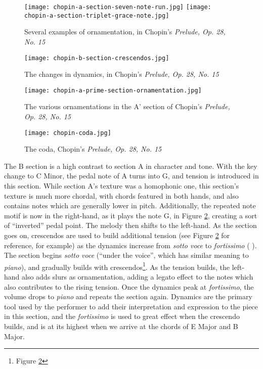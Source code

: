 \begin{figure}
  \centering
  \texttt{[image: chopin-a-section-seven-note-run.jpg]}
  \texttt{[image: chopin-a-section-triplet-grace-note.jpg]}
  \caption{Several examples of ornamentation, in Chopin's \textit{Prelude, Op. 28, No. 15}}
  \label{fig:chopin-a-section-examples-ornamentation}
\end{figure}

\begin{figure}
  \centering
  \texttt{[image: chopin-b-section-crescendos.jpg]}
  \caption{The changes in dynamics, in Chopin's \textit{Prelude, Op. 28, No. 15}}
  \label{fig:chopin-b-section-crescendos}
\end{figure}

\begin{figure}
  \centering
  \texttt{[image: chopin-a-prime-section-ornamentation.jpg]}
  \caption[Ornamentations in A', Chopin's \textit{Prelude, Op. 28, No. 15}]{The various ornamentations in the A' section of Chopin's \textit{Prelude, Op. 28, No. 15}}
  \label{fig:chopin-a-prime-section-ornamentation}
\end{figure}

\begin{figure}
  \centering
  \texttt{[image: chopin-coda.jpg]}
  \caption{The coda, Chopin's \textit{Prelude, Op. 28, No. 15}}
  \label{fig:chopin-coda}
\end{figure}



The B section is a high contrast to section A in character and tone. With the key change to C\musSharp{} Minor, the pedal note of A\musFlat{} turns into G\musSharp{}, and tension is introduced in this section. While section A's texture was a homophonic one, this section's texture is much more chordal, with chords featured in both hands, and also contains notes which are generally lower in pitch. Additionally, the repeated note motif is now in the right-hand, as it plays the note G\musSharp{}, in Figure \ref{fig:chopin-b-section-crescendos}\autocite{Hansen_1973}, creating a sort of ``inverted'' pedal point. The melody then shifts to the left-hand. As the section goes on, crescendos are used to build additional tension (see Figure \ref{fig:chopin-b-section-crescendos}\autocite{Hansen_1973} for reference, for example) as the dynamics increase from \textit{sotto voce} to \textit{fortissimo} ( ). The section begins \textit{sotto voce} (``under the voice'', which has similar meaning to \textit{piano}), and gradually builds with crescendos\footnote{Figure \ref{fig:chopin-b-section-crescendos}}\autocite{Hansen_1973}. As the tension builds, the left-hand also adds slurs as ornamentation, adding a legato effect to the notes which also contributes to the rising tension. Once the dynamics peak at \textit{fortissimo}, the volume drops to \textit{piano} and repeats the section again. Dynamics are the primary tool used by the performer to add their interpretation and expression to the piece in this section, and the \textit{fortissimo} is used to great effect when the crescendo builds, and is at its highest when we arrive at the chords of E Major and B Major.

